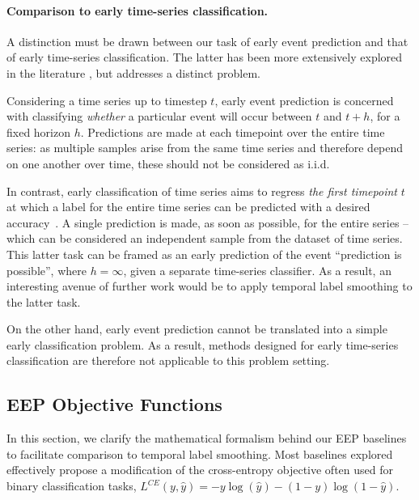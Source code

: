 \documentclass[nohyperref]{article}
\begin{document}
{ \paragraph{Comparison to early time-series classification.} 

A distinction must be drawn between our task of early event prediction and that of early time-series classification. The latter has been more extensively explored in the literature \citep{Xing2009,He2013,Yang2021dir}, but addresses a distinct problem. 

Considering a time series up to timestep $t$, early event prediction is concerned with classifying \textit{whether} a particular event will occur between $t$ and $t+h$, for a fixed horizon $h$. Predictions are made at each timepoint over the entire time series: as multiple samples arise from the same time series and therefore depend on one another over time, these should not be considered as i.i.d.

In contrast, early classification of time series aims to regress \textit{the first timepoint} $t$ at which a label for the entire time series can be predicted with a desired accuracy~\citep{Xing2009}. A single prediction is made, as soon as possible, for the entire series -- which can be considered an independent sample from the dataset of time series. This latter task can be framed as an early prediction of the event “prediction is possible”, where $h=\infty$, given a separate time-series classifier. As a result, an interesting avenue of further work would be to apply temporal label smoothing to the latter task.

On the other hand, early event prediction cannot be translated into a simple early classification problem. As a result, methods designed for early time-series classification are therefore not applicable to this problem setting. 

}

\subsection{EEP Objective Functions} \label{appendix:relatedwork}

In this section, we clarify the mathematical formalism behind our EEP baselines to facilitate comparison to temporal label smoothing. Most baselines explored effectively propose a modification of the cross-entropy objective often used for binary classification tasks, $L^{CE}(y,\hat{y}) = -y\log(\hat{y}) - (1-y) \log(1- \hat{y})$.
\end{document}
